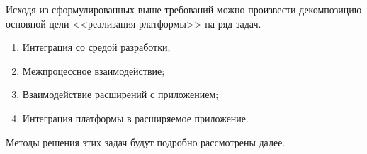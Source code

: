 Исходя из сформулированных выше требований можно произвести декомпозицию основной цели <<реализация рлатформы>> на ряд задач.

\begin{enumerate}
	\item Интеграция со средой разработки;
	\item Межпроцессное взаимодействие;
	\item Взаимодействие расширений с приложением;
	\item Интеграция платформы в расширяемое приложение.
\end{enumerate}

Методы решения этих задач будут подробно рассмотрены далее.



\pagebreak